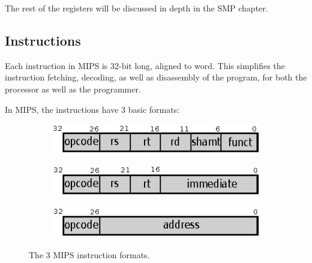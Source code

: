 The rest of the registers will be discussed in depth in the SMP chapter.


\subsection{Instructions}
Each instruction in MIPS is 32-bit long, aligned to word. This simplifies the
instruction fetching, decoding, as well as disassembly of the program,
for both
the processor as well as the programmer.

In MIPS, the instructions have 3 basic formats:
\begin{figure}[H]

\begin{subfigure}[b]{0.3\textwidth}
	\includegraphics{cpu_architecture/r_format.eps}
	\label{fig:instruction_r_format}
\end{subfigure}

\begin{subfigure}[b]{0.3\textwidth}
	\includegraphics{cpu_architecture/i_format.eps}
	\label{fig:instruction_i_format}
\end{subfigure}

\begin{subfigure}[b]{0.3\textwidth}
	\includegraphics{cpu_architecture/j_format.eps}
	\label{fig:instruction_j_format}
\end{subfigure}

\caption{The 3 MIPS instruction formats.}
\label{fig:instruction_formats}
\end{figure}


